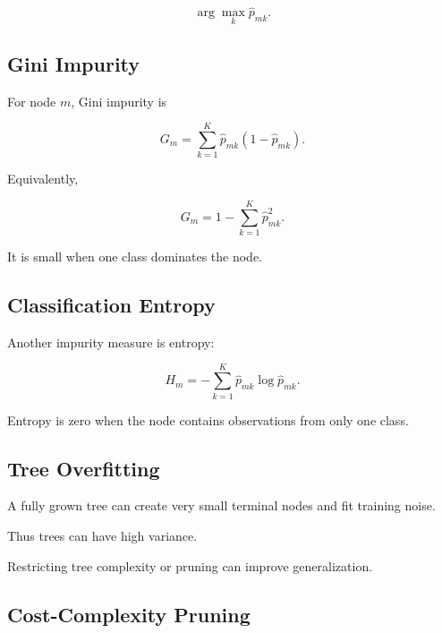 \[
\boxed{
\arg\max_k
\widehat{p}_{mk}.
}
\]

\subsection{Gini Impurity}
\label{subsec:gini-impurity}

For node \(m\), Gini impurity is

\[
\boxed{
G_m
=
\sum_{k=1}^{K}
\widehat{p}_{mk}
(
1-\widehat{p}_{mk}
).
}
\]

Equivalently,

\[
\boxed{
G_m
=
1
-
\sum_{k=1}^{K}
\widehat{p}_{mk}^2.
}
\]

It is small when one class dominates the node.

\subsection{Classification Entropy}
\label{subsec:classification-entropy}

Another impurity measure is entropy:

\[
\boxed{
H_m
=
-
\sum_{k=1}^{K}
\widehat{p}_{mk}
\log
\widehat{p}_{mk}.
}
\]

Entropy is zero when the node contains observations from only one class.

\subsection{Tree Overfitting}
\label{subsec:tree-overfitting}

A fully grown tree can create very small terminal nodes and fit training
noise.

Thus trees can have high variance.

Restricting tree complexity or pruning can improve generalization.

\subsection{Cost-Complexity Pruning}
\label{subsec:cost-complexity-pruning}

